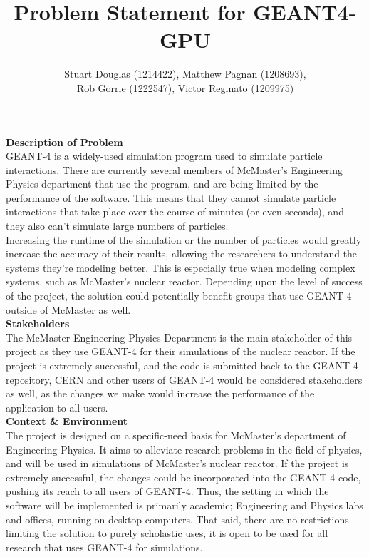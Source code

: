 \documentclass[12pt]{article}
\newcommand{\todo}[1]{\textcolor{red}{[TODO: #1]}} \else
\newcommand{\authornote}[3]{} \newcommand{\todo}[1]{} \fi
\newcommand{\ds}[1]{\authornote{blue}{DS}{#1}} %
\begin{document}
\title{\vspace{-4em}Problem Statement for GEANT4-GPU} \author{Stuart Douglas
(1214422), Matthew Pagnan (1208693), \\ Rob Gorrie (1222547), Victor Reginato
(1209975)}
	
\maketitle


\noindent \textbf{Description of Problem}\\ GEANT-4 is a widely-used simulation
program used to simulate particle interactions. There are currently several
members of McMaster's Engineering Physics department that use the program, and
are being limited by the performance of the software. This means that they
cannot simulate particle interactions that take place over the course of minutes
(or even seconds), and they also can't simulate large numbers of particles.\\

\noindent Increasing the runtime of the simulation or the number of particles
would greatly increase the accuracy of their results, allowing the researchers
to understand the systems they're modeling better. This is especially true when
modeling complex systems, such as McMaster's nuclear reactor. Depending upon the
level of success of the project, the solution could potentially benefit groups
that use GEANT-4 outside of McMaster as well.\\

\noindent \textbf{Stakeholders}\\ The McMaster Engineering Physics Department is
the main stakeholder of this project as they use GEANT-4 for their simulations
of the nuclear reactor. If the project is extremely successful, and the code is submitted back to the GEANT-4 repository, CERN and other users of GEANT-4 would be considered stakeholders as well, as the changes we make would increase the performance of the application to all users.\\

\noindent \textbf{Context \& Environment}\\ The project is designed on a 
specific-need basis for McMaster's department of Engineering Physics. It aims to alleviate research problems in the field of physics, and will be used in simulations of McMaster's nuclear reactor. If the project is extremely successful, the changes could be incorporated into the GEANT-4 code, pushing its reach to all users of GEANT-4. Thus, the setting in which the software will be implemented is primarily academic; Engineering and Physics labs and offices, running on desktop computers. That said, there are no restrictions limiting the solution to purely scholastic uses, it is open to be used for all research that uses GEANT-4 for simulations. \ds{This last sentence is a bit awkward.}\\
 
\end{document}
